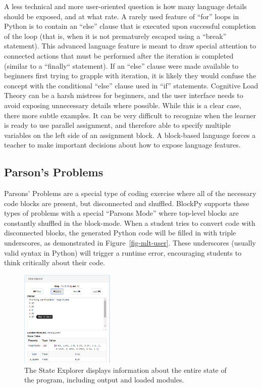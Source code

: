 \documentclass{sig-alternate}
\begin{document}
A less technical and more user-oriented question is how many language details should be exposed, and at what rate.
A rarely used feature of ``for'' loops in Python is to contain an ``else'' clause that is executed upon successful completion of the loop (that is, when it is not prematurely escaped using a ``break'' statement).
This advanced language feature is meant to draw special attention to connected actions that must be performed after the iteration is completed (similar to a ``finally`` statement).
If an ``else'' clause were made available to beginners first trying to grapple with iteration, it is likely they would confuse the concept with the conditional ``else'' clause used in ``if'' statements.
Cognitive Load Theory can be a harsh mistress for beginners, and the user interface needs to avoid exposing unnecessary details where possible.
While this is a clear case, there more subtle examples.
It can be very difficult to recognize when the learner is ready to use parallel assignment, and therefore able to specify multiple variables on the left side of an assignment block.
A block-based language forces a teacher to make important decisions about how to expose language features.

\subsection{Parson's Problems}

Parsons' Problems are a special type of coding exercise where all of the necessary code blocks are present, but disconnected and shuffled.
BlockPy supports these types of problems with a special ``Parsons Mode'' where top-level blocks are constantly shuffled in the block-mode.
When a student tries to convert code with disconnected blocks, the generated Python code will be filled in with triple underscores, as demonstrated in Figure~\ref{fig-mlt-user}.
These underscores (usually valid syntax in Python) will trigger a runtime error, encouraging students to think critically about their code.

\begin{figure}
\begin{center}
\includegraphics[width=0.4\textwidth]{images/blockpyStateExplorer}
\end{center}
\label{fig-state-explorer}
\caption{The State Explorer displays information about the entire state of the program, including output and loaded modules.}
\end{figure}
\end{document}
